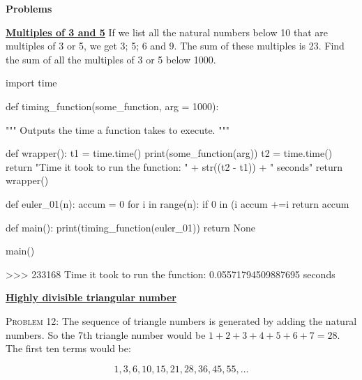 \documentclass[11pt]{article}
\begin{document}
\vspace{3em}
\begin{center}
{\bf  Problems}\\ 
\end{center}
\noindent
\href{https://projecteuler.net/problem=1}{\textbf{Multiples of 3 and 5}}
If we list all the natural numbers below 10 that are multiples of 3 or 5, we get 3; 5; 6 and 9. 
The sum of these multiples is 23.
Find the sum of all the multiples of 3 or 5 below 1000.
\begin{code}
import time

def timing_function(some_function, arg = 1000):

    """
    Outputs the time a function takes
    to execute.
    """

    def wrapper():
        t1 = time.time()
        print(some_function(arg))
        t2 = time.time()
        return "Time it took to run the function: " + str((t2 - t1)) + " seconds"
    return wrapper()

def euler_01(n):
    accum = 0
    for i in range(n):
        if 0 in (i %
            accum +=i
    return accum

def main():
    print(timing_function(euler_01))
    return None

main()
\end{code}
\begin{shell}
>>> 233168
Time it took to run the function: 0.05571794509887695 seconds
\end{shell}

\par\bigskip\noindent
\href{https://projecteuler.net/problem=12}{\textbf{Highly divisible triangular number}}\par\noindent
\textsc{Problem 12:}
The sequence of triangle numbers is generated by adding the natural numbers. So the 7\textrm{th} triangle number would be $1 + 2 + 3 + 4 + 5 + 6 + 7 = 28$. The first ten terms would be:

\begin{equation*}
1, 3, 6, 10, 15, 21, 28, 36, 45, 55, \dotsc  
\end{equation*}
\end{document}
